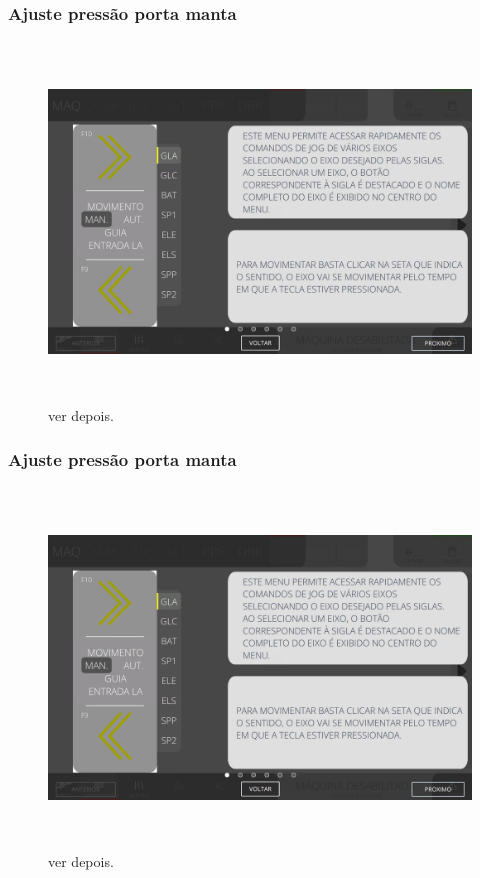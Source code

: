 \newpage
\thispagestyle{fancy}
\vspace*{\fill}
\subsubsection{\small{Ajuste pressão porta manta}}
\begin{figure}[h]
  \centering
  \includegraphics[width=576px,height=360px]{src/imagesFlexo/08-count/commands/e-1.png}
  \caption{ver depois.}
   \label{}
\end{figure}
\vspace*{\fill}

\newpage
\thispagestyle{fancy}
\vspace*{\fill}
\subsubsection{\small{Ajuste pressão porta manta}}
\begin{figure}[h]
  \centering
  \includegraphics[width=576px,height=360px]{src/imagesFlexo/08-count/commands/e-1.png}
  \caption{ver depois.}
   \label{}
\end{figure}
\vspace*{\fill}